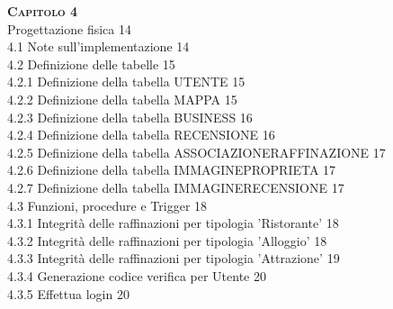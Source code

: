 \documentclass[a4paper,12pt]{article}
\begin{document}
\begin{flushleft}
\Large\textsc{\bf Capitolo 4}\\
\hspace{+1cm}\large Progettazione fisica \hfill 14\\
\hspace{+2cm}\large 4.1 Note sull'implementazione \hfill 14\\
\hspace{+2cm}\large 4.2 Definizione delle tabelle \hfill 15\\
\hspace{+3cm}\normalsize 4.2.1 Definizione della tabella UTENTE \hfill 15\\
\hspace{+3cm}\normalsize 4.2.2 Definizione della tabella MAPPA \hfill 15\\
\hspace{+3cm}\normalsize 4.2.3 Definizione della tabella BUSINESS \hfill 16\\
\hspace{+3cm}\normalsize 4.2.4 Definizione della tabella RECENSIONE \hfill 16\\
\hspace{+3cm}\normalsize 4.2.5 Definizione della tabella ASSOCIAZIONERAFFINAZIONE \hfill 17\\
\hspace{+3cm}\normalsize 4.2.6 Definizione della tabella IMMAGINEPROPRIETA \hfill 17\\
\hspace{+3cm}\normalsize 4.2.7 Definizione della tabella IMMAGINERECENSIONE \hfill 17\\
\hspace{+2cm}\large 4.3 Funzioni, procedure e Trigger \hfill 18\\
\hspace{+3cm}\normalsize 4.3.1 Integrità delle raffinazioni per tipologia 'Ristorante' \hfill 18\\
\hspace{+3cm}\normalsize 4.3.2 Integrità delle raffinazioni per tipologia 'Alloggio' \hfill 18\\
\hspace{+3cm}\normalsize 4.3.3 Integrità delle raffinazioni per tipologia 'Attrazione' \hfill 19\\
\hspace{+3cm}\normalsize 4.3.4 Generazione codice verifica per Utente \hfill 20\\
\hspace{+3cm}\normalsize 4.3.5 Effettua login \hfill 20\\

\end{flushleft}
\end{document}
